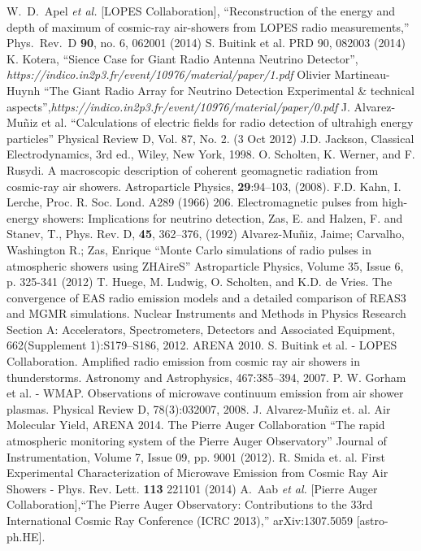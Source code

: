 \begin{thebibliography}{1}
 W.~D.~Apel {\it et al.} [LOPES Collaboration], ``Reconstruction of the energy and depth of maximum of cosmic-ray air-showers from LOPES radio measurements,'' Phys.\ Rev.\ D {\bf 90}, no. 6, 062001 (2014)
 S. Buitink et al. PRD 90, 082003 (2014)
 K. Kotera, ``Sience Case for Giant Radio Antenna Neutrino Detector'', \emph{https://indico.in2p3.fr/event/10976/material/paper/1.pdf}
 Olivier Martineau-Huynh ``The Giant Radio Array for Neutrino Detection Experimental $\&$ technical aspects'',\newline \emph{https://indico.in2p3.fr/event/10976/material/paper/0.pdf}
 J. Alvarez-Mu\~niz et al. ``Calculations of electric fields for radio detection of ultrahigh energy particles'' Physical Review D, Vol. 87, No. 2. (3 Oct 2012)
 J.D. Jackson, Classical Electrodynamics, 3rd ed., Wiley, New York, 1998.
 O. Scholten, K. Werner, and F. Rusydi. A macroscopic description of coherent geomagnetic radiation from cosmic-ray air showers. Astroparticle Physics, {\bf 29}:94–103, (2008).
 F.D. Kahn, I. Lerche, Proc. R. Soc. Lond. A289 (1966) 206.
 Electromagnetic pulses from high-energy showers: Implications for neutrino detection, Zas, E. and Halzen, F. and Stanev, T., Phys. Rev. D, \textbf{45}, 362--376, (1992)
 Alvarez-Muñiz, Jaime; Carvalho, Washington R.; Zas, Enrique ``Monte Carlo simulations of radio pulses in atmospheric showers using ZHAireS'' Astroparticle Physics, Volume 35, Issue 6, p. 325-341 (2012)
 T. Huege, M. Ludwig, O. Scholten, and K.D. de Vries. The convergence of EAS radio emission models and a detailed comparison of REAS3 and MGMR simulations. Nuclear Instruments and Methods in Physics Research Section A: Accelerators, Spectrometers, Detectors and Associated Equipment, 662(Supplement 1):S179–S186, 2012. ARENA 2010.
 S. Buitink et al. - LOPES Collaboration. Amplified radio emission from cosmic ray air showers in thunderstorms. Astronomy and Astrophysics, 467:385–394, 2007.
 P. W. Gorham et al. - WMAP. Observations of microwave continuum emission from air shower plasmas. Physical Review D, 78(3):032007, 2008.
 J. Alvarez-Mu\~niz et. al. Air Molecular Yield, ARENA 2014.
 The Pierre Auger Collaboration ``The rapid atmospheric monitoring system of the Pierre Auger Observatory'' Journal of Instrumentation, Volume 7, Issue 09, pp. 9001 (2012).
 R. Smida et. al. First Experimental Characterization of Microwave Emission from Cosmic Ray Air Showers - Phys. Rev. Lett. \textbf{113} 221101 (2014)
 A.~Aab {\it et al.} [Pierre Auger Collaboration],``The Pierre Auger Observatory: Contributions to the 33rd International Cosmic Ray Conference (ICRC 2013),'' arXiv:1307.5059 [astro-ph.HE].


\end{thebibliography}
